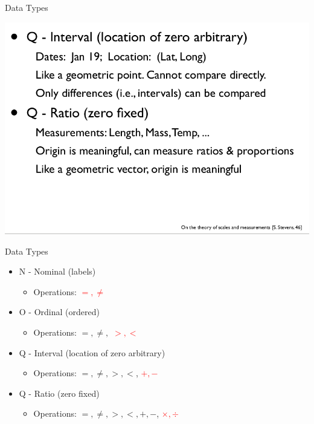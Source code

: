 \documentclass{beamer}
\newcommand{\hred}[1]{{\textcolor{red}{#1}}}
\begin{document}
\begin{frame}{Data Types}
    \begin{center}                                                                                                           
        \includegraphics[scale=0.40]{dataTypes2.png}                                                
    \end{center}                                                                                                             
\end{frame}   

\begin{frame}{Data Types} 
    \begin{itemize}
        \item N - Nominal (labels) 
        \begin{itemize}
            \item Operations: \hred{$=, \neq$}
        \end{itemize}
        \item O - Ordinal (ordered)
        \begin{itemize}
            \item Operations: $=, \neq,$ \hred{$>,<$}
        \end{itemize}
        \item Q - Interval (location of zero arbitrary)
        \begin{itemize}
            \item Operations: $=, \neq, >, < $, \hred{$+,-$}
        \end{itemize}
        \item Q - Ratio (zero fixed)
        \begin{itemize}
            \item Operations: $=, \neq, >, <, +,-$, \hred{$\times, \div$}
        \end{itemize}
    \end{itemize}
\end{frame}  
\end{document}
